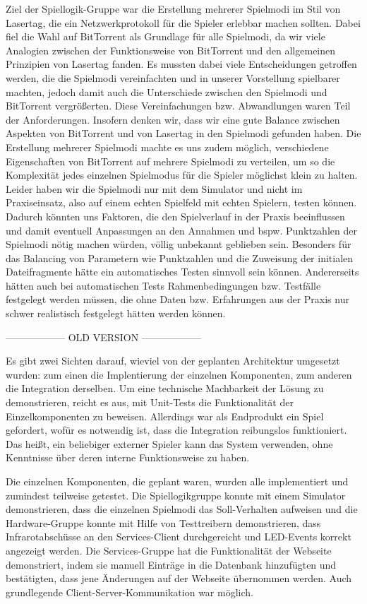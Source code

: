 Ziel der Spiellogik-Gruppe war die Erstellung mehrerer Spielmodi im Stil von Lasertag, die ein Netzwerkprotokoll für die Spieler erlebbar machen sollten. Dabei fiel die Wahl auf BitTorrent als Grundlage für alle Spielmodi, da wir viele Analogien zwischen der Funktionsweise von BitTorrent und den allgemeinen Prinzipien von Lasertag fanden. Es mussten dabei viele Entscheidungen getroffen werden, die die Spielmodi vereinfachten und in unserer Vorstellung spielbarer machten, jedoch damit auch die Unterschiede zwischen den Spielmodi und BitTorrent vergrößerten. Diese Vereinfachungen bzw. Abwandlungen waren Teil der Anforderungen. Insofern denken wir, dass wir eine gute Balance zwischen Aspekten von BitTorrent und von Lasertag in den Spielmodi gefunden haben. Die Erstellung mehrerer Spielmodi machte es uns zudem möglich, verschiedene Eigenschaften von BitTorrent auf mehrere Spielmodi zu verteilen, um so die Komplexität jedes einzelnen Spielmodus für die Spieler möglichst klein zu halten.
Leider haben wir die Spielmodi nur mit dem Simulator und nicht im Praxiseinsatz, also auf einem echten Spielfeld mit echten Spielern, testen können. Dadurch könnten uns Faktoren, die den Spielverlauf in der Praxis beeinflussen und damit eventuell Anpassungen an den Annahmen und bspw. Punktzahlen der Spielmodi nötig machen würden, völlig unbekannt geblieben sein.
Besonders für das Balancing von Parametern wie Punktzahlen und die Zuweisung der initialen Dateifragmente hätte ein automatisches Testen sinnvoll sein können. Andererseits hätten auch bei automatischen Tests Rahmenbedingungen bzw. Testfälle festgelegt werden müssen, die ohne Daten bzw. Erfahrungen aus der Praxis nur schwer realistisch festgelegt hätten werden können.

------------------ OLD VERSION ------------------



Es gibt zwei Sichten darauf, wieviel von der geplanten Architektur umgesetzt wurden: zum einen die
Implentierung der einzelnen Komponenten, zum anderen die Integration derselben.
Um eine technische Machbarkeit der Lösung zu demonstrieren, reicht es aus, mit Unit-Tests die
Funktionalität der Einzelkomponenten zu beweisen.
Allerdings war als Endprodukt ein Spiel gefordert, wofür es notwendig ist, dass die Integration
reibungslos funktioniert.
Das heißt, ein beliebiger externer Spieler kann das System verwenden, ohne Kenntnisse über deren
interne Funktionsweise zu haben.

Die einzelnen Komponenten, die geplant waren, wurden alle implementiert und zumindest teilweise
getestet.
Die Spiellogikgruppe konnte mit einem Simulator demonstrieren, dass die einzelnen Spielmodi das
Soll-Verhalten aufweisen und die Hardware-Gruppe konnte mit Hilfe von Testtreibern demonstrieren,
dass Infrarotabschüsse an den Services-Client durchgereicht und LED-Events korrekt angezeigt werden.
Die Services-Gruppe hat die Funktionalität der Webseite demonstriert, indem sie manuell Einträge in
die Datenbank hinzufügten und bestätigten, dass jene Änderungen auf der Webseite übernommen werden.
Auch grundlegende Client-Server-Kommunikation war möglich.

